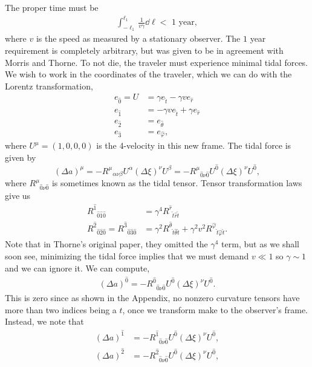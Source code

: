 \documentclass[%
 reprint,
 amsmath,amssymb
 aps,
]{revtex4}
\theoremstyle{remark}
\begin{document}
The proper time must be 
\begin{align}
    \int_{-\ell_1}^{\ell_1} \frac{1}{v\gamma}\dd{\ell} < \text{ 1 year},
\end{align}
where $v$ is the speed as measured by a stationary observer. The $1$ year requirement is completely arbitrary, but was given to be in agreement with Morris and Thorne\cite{Thorne}. To not die, the traveler must experience minimal tidal forces. We wish to work in the coordinates of the traveler, which we can do with the Lorentz transformation,
\begin{align}
    e_{\hat{0}} = U &= \gamma e_{\hat{t}} -\gamma v e_{\hat{r}} \\
    e_{\hat{1}} &= -\gamma v e_{\hat{t}} + \gamma e_{\hat{r}} \\
    e_{\hat{2}} &= e_{\hat{\theta}} \\
    e_{\hat{3}} &= e_{\hat{\varphi}},
\end{align}
where $U^{\mu}=(1,0,0,0)$ is the 4-velocity in this new frame.
The tidal force is given by 
\begin{equation}
    (\Delta a)^{\mu} = -R^{\mu}{}_{\alpha\nu\beta}U^{\alpha}(\Delta \xi)^{\nu}U^{\beta}= -R^{\mu}{}_{\hat{0}\nu\hat{0}}U^{\hat{0}}(\Delta \xi)^{\nu}U^{\hat{0}},
\end{equation}
where $R^{\mu}{}_{\hat{0}\nu\hat{0}}$ is sometimes known as the tidal tensor. Tensor transformation laws give us 
\begin{align}
    R^{\hat{1}}{}_{\hat{0}\hat{1}\hat{0}} &= \gamma^4 R^{\hat{r}}{}_{\hat{t}\hat{r}\hat{t}} \\
    R^{\hat{2}}{}_{\hat{0}\hat{2}\hat{0}} = R^{\hat{3}}{}_{\hat{0}\hat{3}\hat{0}} &= \gamma^2 R^{\hat{\theta}}{}_{\hat{t}\hat{\theta}\hat{t}}  + \gamma^2v^2R^{\hat{\varphi}}{}_{\hat{t}\hat{\varphi}\hat{t}}.
\end{align}
Note that in Thorne's original paper, they omitted the $\gamma^4$ term, but as we shall soon see, minimizing the tidal force implies that we must demand $v \ll 1$ so $\gamma \sim 1$ and we can ignore it\cite{Thorne}. We can compute,
\begin{align}
    (\Delta a)^{\hat{0}} = -R^{\hat{0}}{}_{\hat{0}\nu\hat{0}}U^{\hat{0}}(\Delta \xi)^{\nu}U^{\hat{0}}.
\end{align}
This is zero since as shown in the Appendix, no nonzero curvature tensors have more than two indices being a $t$, once we transform make to the observer's frame. Instead, we note that 
\begin{align}
    (\Delta a)^{\hat{1}} &= -R^{\hat{1}}{}_{\hat{0}\nu \hat{0}}U^{\hat{0}}(\Delta \xi)^{\nu}U^{\hat{0}}, \\
    (\Delta a)^{\hat{2}} &= -R^{\hat{2}}{}_{\hat{0}\nu \hat{0}}U^{\hat{0}}(\Delta \xi)^{\nu}U^{\hat{0}},
\end{align}
\end{document}
